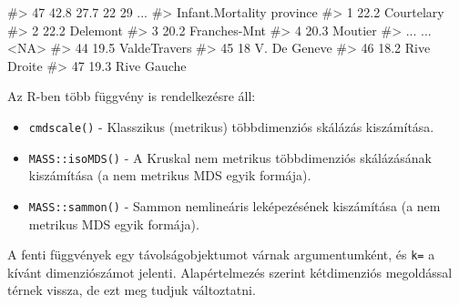 \documentclass[
  letterpaper,
]{krantz}
\makeatletter
\newenvironment{Shaded}{\begin{snugshade}}{\end{snugshade}}
\newcommand{\AttributeTok}[1]{\textcolor[rgb]{0.40,0.45,0.13}{#1}}
\newcommand{\CommentTok}[1]{\textcolor[rgb]{0.37,0.37,0.37}{#1}}
\newcommand{\ConstantTok}[1]{\textcolor[rgb]{0.56,0.35,0.01}{#1}}
\newcommand{\DecValTok}[1]{\textcolor[rgb]{0.68,0.00,0.00}{#1}}
\newcommand{\FunctionTok}[1]{\textcolor[rgb]{0.28,0.35,0.67}{#1}}
\newcommand{\NormalTok}[1]{\textcolor[rgb]{0.00,0.23,0.31}{#1}}
\newcommand{\OtherTok}[1]{\textcolor[rgb]{0.00,0.23,0.31}{#1}}
\newcommand{\SpecialCharTok}[1]{\textcolor[rgb]{0.37,0.37,0.37}{#1}}
\newcommand{\StringTok}[1]{\textcolor[rgb]{0.13,0.47,0.30}{#1}}
\providecommand{\tightlist}{%
  \setlength{\itemsep}{0pt}\setlength{\parskip}{0pt}}\usepackage{longtable,booktabs,array}
\newenvironment{kframe}{%
\medskip{}
\setlength{\fboxsep}{.8em}
 \def\at@end@of@kframe{}%
 \ifinner\ifhmode%
  \def\at@end@of@kframe{\end{minipage}}%
  \begin{minipage}{\columnwidth}%
 \fi\fi%
 \def\FrameCommand##1{\hskip\@totalleftmargin \hskip-\fboxsep
 \colorbox{shadecolor}{##1}\hskip-\fboxsep
     \hskip-\linewidth \hskip-\@totalleftmargin \hskip\columnwidth}%
 \MakeFramed {\advance\hsize-\width
   \@totalleftmargin\z@ \linewidth\hsize
   \@setminipage}}%
 {\par\unskip\endMakeFramed%
 \at@end@of@kframe}
\renewenvironment{Shaded}{\begin{kframe}}{\end{kframe}}
\makeatother
\begin{document}
\begin{Shaded}
\begin{Highlighting}[]
\CommentTok{\#\textgreater{} 47       42.8        27.7          22        29    ...}
\CommentTok{\#\textgreater{}     Infant.Mortality     province}
\CommentTok{\#\textgreater{} 1               22.2   Courtelary}
\CommentTok{\#\textgreater{} 2               22.2     Delemont}
\CommentTok{\#\textgreater{} 3               20.2 Franches{-}Mnt}
\CommentTok{\#\textgreater{} 4               20.3      Moutier}
\CommentTok{\#\textgreater{} ...              ...         \textless{}NA\textgreater{}}
\CommentTok{\#\textgreater{} 44              19.5 ValdeTravers}
\CommentTok{\#\textgreater{} 45                18 V. De Geneve}
\CommentTok{\#\textgreater{} 46              18.2  Rive Droite}
\CommentTok{\#\textgreater{} 47              19.3  Rive Gauche}
\end{Highlighting}
\end{Shaded}

Az R-ben több függvény is rendelkezésre áll:

\begin{itemize}
\tightlist
\item
  \texttt{cmdscale()} - Klasszikus (metrikus) többdimenziós skálázás
  kiszámítása.
\item
  \texttt{MASS::isoMDS()} - A Kruskal nem metrikus többdimenziós
  skálázásának kiszámítása (a nem metrikus MDS egyik formája).
\item
  \texttt{MASS::sammon()} - Sammon nemlineáris leképezésének kiszámítása
  (a nem metrikus MDS egyik formája).
\end{itemize}

A fenti függvények egy távolságobjektumot várnak argumentumként, és
\texttt{k=} a kívánt dimenziószámot jelenti. Alapértelmezés szerint
kétdimenziós megoldással térnek vissza, de ezt meg tudjuk változtatni.

\begin{Shaded}
\end{Shaded}
\end{document}
